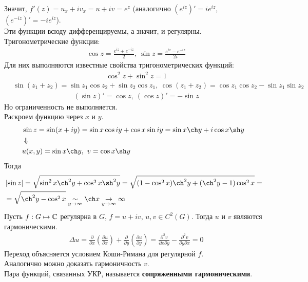 Значит, $f'(z) = u_x + iv_x = u+iv = e^z$ (аналогично $(e^{iz})' = ie^{iz}$,
$(e^{-iz})' = -ie^{iz}$).
\\
Эти функции всюду дифференцируемы, а значит, и регулярны.
\Def
Тригонометрические функции:
\begin{align*}
  & \cos z = \frac{e^{iz} + e^{-iz}}{2}, \ \sin z = \frac{e^{iz} -e^{-iz}}{2i}
\end{align*}
Для них выполняются известные свойства тригонометрических функций:
\begin{align*}
  & \cos^2 z + \sin^2 z = 1
\end{align*}
\begin{align*}
  & \sin(z_1+z_2) = \sin z_1 \cos z_2 + \sin z_2 \cos z_1, \ \cos(z_1+z_2) = \cos z_1 \cos z_2 - \sin z_1 \sin z_2
\end{align*}
\begin{align*}
  & \left( \sin z \right)' = \cos z, \ \left( \cos z \right)' = - \sin z
\end{align*}
Но ограниченность не выполняется.
\\
Раскроем функцию через $x$ и $y$.
\begin{align*}
  & \sin z = \sin(x+iy) = \sin x \cos iy + \cos x \sin iy = \sin x \ch y + i \cos x \sh y \\
  & \Downarrow \\
  & u(x,y) = \sin x \ch y, \ v = \cos x \sh y
\end{align*}
Тогда
\begin{align*}
  & \left| \sin z \right| = \sqrt{\sin^2 x \ch^2 y + \cos^2 x \sh^2 y} = \sqrt{(1-\cos^2 x)\ch^2 y + (\ch^2 y - 1)\cos^2 x} = \\
  & = \sqrt{\ch^2 y - \cos^2 x} \us{y \to \infty}{\sim} \ch x \us{y \to \infty}{\to} \infty
\end{align*}
\theorem
Пусть $f: G \mapsto \mathbb{C}$ регулярна в $G$, $f = u + iv$, $u,v \in C^2(G)$. Тогда
$u$ и $v$ являются гармоническими.
\pr
\begin{align*}
  & \Delta u = \frac{\partial}{\partial x}\left( \frac{\partial u}{\partial x} \right)+ \frac{\partial}{\partial y} \left( \frac{\partial u}{\partial y} \right) = \frac{\partial^2 v}{\partial x \partial y} - \frac{\partial^2 v}{\partial y \partial x} = 0
\end{align*}
Переход объясняется условием Коши-Римана для регулярной $f$.
\\
Аналогично можно доказать гармоничность $v$.
\\
Пара функций, связанных УКР, называется \textbf{сопряженными гармоническими}.
